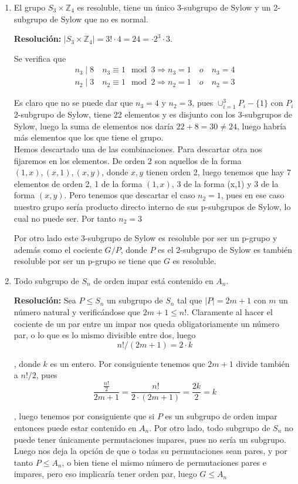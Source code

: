 \documentclass{article}
\begin{document}
\begin{enumerate}
\item El grupo $S_3\times \mathbb{Z}_4$ es resoluble, tiene un único 3-subgrupo de Sylow y un 2-subgrupo de Sylow que no es normal.

\textbf{Resolución:} $|S_3\times \mathbb{Z}_4|=3!\cdot 4=24=\cdot 2^3\cdot 3$.

Se verifica que 
\begin{gather*}
n_3\mid 8\quad n_3\equiv 1\mod 3 \Rightarrow n_3=1\quad o \quad n_3=4\\
n_2\mid 3\quad n_2\equiv 1\mod 2 \Rightarrow n_2=1\quad o \quad n_2=3
\end{gather*}

Es claro que no se puede dar que $n_3=4$ y $n_2=3$, pues $\cup_{i=1}^3 P_i-\{1\}$ con $P_i$ 2-subgrupo de Sylow, tiene 22 elementos y es disjunto con los 3-subgrupos de Sylow, luego la suma de elementos nos daría $22+8=30\neq 24$, luego habría más elementos que los que tiene el grupo. \\

Hemos descartado una de las combinaciones. Para descartar otra nos fijaremos en los elementos. De orden 2 son aquellos de la forma $(1,x),(x,1),(x,y)$, donde $x,y$ tienen orden 2, luego tenemos que hay 7 elementos de orden 2, 1 de la forma $(1,x)$, 3 de la forma (x,1) y 3 de la forma $(x,y)$. Pero tenemos que descartar el caso $n_2=1$, pues en ese caso nuestro grupo sería producto directo interno de sus p-subgrupos de Sylow, lo cual no puede ser. Por tanto $n_2=3$

Por otro lado este 3-subgrupo de Sylow es resoluble por ser un p-grupo y además como el cociente $G/P$, donde $P$ es el 2-subgrupo de Sylow es también resoluble por ser un p-grupo se tiene que $G$ es resoluble.

\item Todo subgrupo de $S_n$ de orden impar está contenido en $A_n$.

\textbf{Resolución:} Sea $P\leq S_n$ un subgrupo de $S_n$ tal que $|P|=2m+1$ con $m$ un número natural y verificándose que $2m+1\leq n!$. Claramente al hacer el cociente de un par entre un impar nos queda obligatoriamente un número par, o lo que es lo mismo divisible entre dos, luego
\[n!/(2m+1)=2\cdot k\]

, donde $k$ es un entero. Por consiguiente tenemos que $2m+1$ divide también a $n!/2$, pues 
\begin{equation*}
\frac{\frac{n!}{2}}{2m+1}=\frac{n!}{2\cdot(2m+1)}=\frac{2k}{2}=k
\end{equation*}

, luego tenemos por consiguiente que si $P$ es un subgrupo de orden impar entonces puede estar contenido en $A_n$. Por otro lado, todo subgrupo de $S_n$ no puede tener únicamente permutaciones impares, pues no sería un subgrupo. Luego nos deja la opción de que o todas su permutaciones sean pares, y por tanto $P\leq A_n$, o bien tiene el mismo número de permutaciones pares e impares, pero eso implicaría tener orden par, luego $G\leq A_n$
\end{enumerate}
\end{document}
